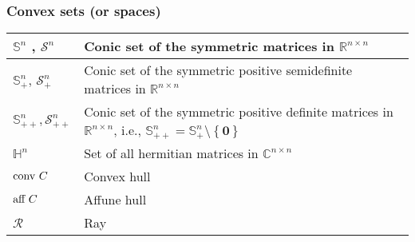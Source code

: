 \documentclass{article}
\begin{document}
\subsubsection{Convex sets (or spaces)}
\begin{xltabular}{\textwidth}{XX}
	\(\mathbb{S}^{n}\) \cite{dattorroConvexOptimizationEuclidean2010}, \(\mathcal{S}^{n}\) \cite{boydConvexOptimization2004} & Conic set of the symmetric matrices in \(\mathbb{R}^{n\times n}\)                                                                                                                                              \\ \hline
	\(\mathbb{S}_{+}^{n}\), \(\mathcal{S}_{+}^{n}\)                                                                          & Conic set of the symmetric positive semidefinite matrices in \(\mathbb{R}^{n\times n}\) \cite{boydConvexOptimization2004}                                                                                      \\ \hline
	\(\mathbb{S}_{++}^{n}, \mathcal{S}_{++}^{n}\)                                                                            & Conic set of the symmetric positive definite matrices in \(\mathbb{R}^{n\times n}\), i.e., \(\mathbb{S}_{++}^{n} = \mathbb{S}_{+}^{n}\setminus \left\{ \mathbf{0} \right\}\) \cite{boydConvexOptimization2004} \\ \hline
	\(\mathbb{H}^{n}\)                                                                                                       & Set of all hermitian matrices in \(\mathbb{C}^{n\times n}\)                                                                                                                                                    \\ \hline
	\(\textnormal{conv } C\)                                                                                                 & Convex hull                                                                                                                                                                                                    \\ \hline
	\(\textnormal{aff } C\)                                                                                                  & Affune hull                                                                                                                                                                                                    \\ \hline
	\(\mathcal{R}\)                                                                                                          & Ray                                                                                                                                                                                                            \\ \hline

\end{xltabular}
\end{document}
